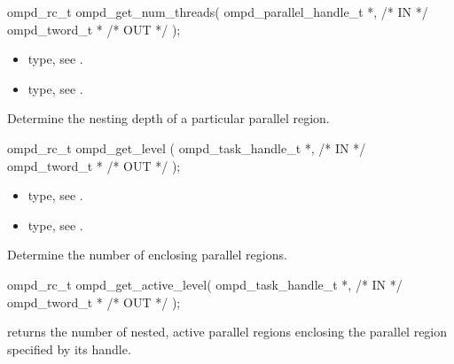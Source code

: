\format
\cspecificstart
\begin{boxedcode}
ompd\_rc\_t ompd\_get\_num\_threads(
  ompd\_parallel\_handle\_t *,                         /* IN */
  ompd\_tword\_t *                                     /* OUT */
);
\end{boxedcode}
\cspecificend

\descr

\argdesc

\crossreferences
\begin{itemize}
	\item {} type, see .
	\item {} type, see .
\end{itemize}


\summary
Determine the nesting depth of a particular parallel region.

\format
\cspecificstart
\begin{boxedcode}
ompd\_rc\_t ompd\_get\_level (
  ompd\_task\_handle\_t *,                                 /* IN */
  ompd\_tword\_t *                                         /* OUT */
); 
\end{boxedcode}
\cspecificend

\descr

\argdesc

\crossreferences
\begin{itemize}
	\item {} type, see .
	\item {} type, see .
\end{itemize}


\summary
Determine the number of enclosing  parallel regions.

\format
\cspecificstart
\begin{boxedcode}
ompd\_rc\_t ompd\_get\_active\_level(
  ompd\_task\_handle\_t *,                                 /* IN */
  ompd\_tword\_t *                                         /* OUT */
); 
\end{boxedcode}
\cspecificend

\descr
{} returns the number of nested, active
parallel regions enclosing the parallel region specified by its handle.

